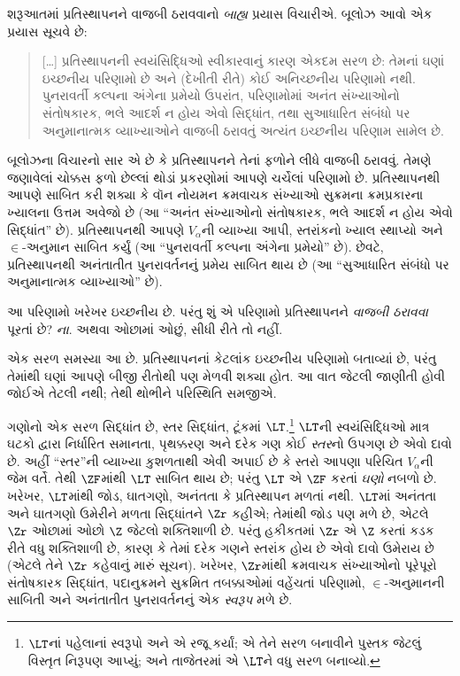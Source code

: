 \documentclass[../../../include/open-logic-section]{subfiles}
\begin{document}

શરૂઆતમાં પ્રતિસ્થાપનને વાજબી ઠરાવવાનો \emph{બાહ્ય} પ્રયાસ
વિચારીએ. બૂલોઝ આવો એક પ્રયાસ સૂચવે છે:
\begin{quote}
  [\ldots] પ્રતિસ્થાપનની સ્વયંસિદ્ધિઓ સ્વીકારવાનું કારણ એકદમ
  સરળ છે: તેમનાં ઘણાં ઇચ્છનીય પરિણામો છે અને (દેખીતી રીતે)
  કોઈ અનિચ્છનીય પરિણામો નથી. પુનરાવર્તી કલ્પના અંગેના
  પ્રમેયો ઉપરાંત, પરિણામોમાં અનંત સંખ્યાઓનો સંતોષકારક,
  ભલે આદર્શ ન હોય એવો સિદ્ધાંત, તથા સુઆધારિત સંબંધો પર
  અનુમાનાત્મક વ્યાખ્યાઓને વાજબી ઠરાવતું અત્યંત ઇચ્છનીય
  પરિણામ સામેલ છે.
  \citep[229]{Boolos1971}
\end{quote}
બૂલોઝના વિચારનો સાર એ છે કે પ્રતિસ્થાપનને તેનાં ફળોને લીધે
વાજબી ઠરાવવું. તેમણે જણાવેલાં ચોક્કસ ફળો છેલ્લાં થોડાં
પ્રકરણોમાં આપણે ચર્ચેલાં પરિણામો છે. પ્રતિસ્થાપનથી આપણે
સાબિત કરી શક્યા કે વૉન નોયમન ક્રમવાચક સંખ્યાઓ સુક્રમના
ક્રમપ્રકારના ખ્યાલના ઉત્તમ અવેજો છે (આ ``અનંત સંખ્યાઓનો
સંતોષકારક, ભલે આદર્શ ન હોય એવો સિદ્ધાંત'' છે).
પ્રતિસ્થાપનથી આપણે $V_\alpha$ની વ્યાખ્યા આપી, સ્તરાંકનો
ખ્યાલ સ્થાપ્યો અને $\in$-અનુમાન સાબિત કર્યું (આ
``પુનરાવર્તી કલ્પના અંગેના પ્રમેયો'' છે). છેવટે,
પ્રતિસ્થાપનથી અનંતાતીત પુનરાવર્તનનું પ્રમેય સાબિત થાય છે
(આ ``સુઆધારિત સંબંધો પર અનુમાનાત્મક વ્યાખ્યાઓ'' છે).

આ પરિણામો ખરેખર ઇચ્છનીય છે. પરંતુ શું એ પરિણામો
પ્રતિસ્થાપનને \emph{વાજબી ઠરાવવા} પૂરતાં છે? \emph{ના}.
અથવા ઓછામાં ઓછું, સીધી રીતે તો નહીં.

એક સરળ સમસ્યા આ છે. પ્રતિસ્થાપનનાં કેટલાંક ઇચ્છનીય
પરિણામો બતાવ્યાં છે, પરંતુ તેમાંથી ઘણાં આપણે બીજી રીતોથી
પણ મેળવી શક્યા હોત. આ વાત જેટલી જાણીતી હોવી જોઈએ
તેટલી નથી; તેથી થોભીને પરિસ્થિતિ સમજીએ.

ગણોનો એક સરળ સિદ્ધાંત છે, સ્તર સિદ્ધાંત, ટૂંકમાં
$\LT$.\footnote{$\LT$નાં પહેલાનાં સ્વરૂપો \citet{Montague1965}
અને \citet{Scott1974}એ રજૂ કર્યાં; \citet{Potter2004}એ તેને
સરળ બનાવીને પુસ્તક જેટલું વિસ્તૃત નિરૂપણ આપ્યું; અને
તાજેતરમાં \citet{ButtonLT1}એ $\LT$ને વધુ સરળ બનાવ્યો.}
$\LT$ની સ્વયંસિદ્ધિઓ માત્ર ઘટકો દ્વારા નિર્ધારિત સમાનતા,
પૃથક્કરણ અને
દરેક ગણ કોઈ \emph{સ્તર}નો ઉપગણ છે એવો દાવો છે. અહીં
``સ્તર''ની વ્યાખ્યા કુશળતાથી એવી અપાઈ છે કે સ્તરો
આપણા પરિચિત $V_\alpha$ની જેમ વર્તે. તેથી $\ZF$માંથી
$\LT$ સાબિત થાય છે; પરંતુ $\LT$ એ $\ZF$ કરતાં
\emph{ઘણો} નબળો છે. ખરેખર, $\LT$માંથી જોડ, ઘાતગણો,
અનંતતા કે પ્રતિસ્થાપન મળતાં નથી. $\LT$માં અનંતતા અને
ઘાતગણો ઉમેરીને મળતા સિદ્ધાંતને $\Zr$ કહીએ; તેમાંથી
જોડ પણ મળે છે, એટલે $\Zr$ ઓછામાં ઓછો $\Z$ જેટલો
શક્તિશાળી છે. પરંતુ હકીકતમાં $\Zr$ એ $\Z$ કરતાં
કડક રીતે વધુ શક્તિશાળી છે, કારણ કે તેમાં દરેક ગણને સ્તરાંક
હોય છે એવો દાવો ઉમેરાય છે (એટલે તેને $\Zr$ કહેવાનું
મારું સૂચન). ખરેખર, $\Zr$માંથી ક્રમવાચક સંખ્યાઓનો
પૂરેપૂરો સંતોષકારક સિદ્ધાંત, પદાનુક્રમને સુક્રમિત તબક્કાઓમાં
વહેંચતાં પરિણામો, $\in$-અનુમાનની સાબિતી અને અનંતાતીત
પુનરાવર્તનનું એક \emph{સ્વરૂપ} મળે છે.
\end{document}
